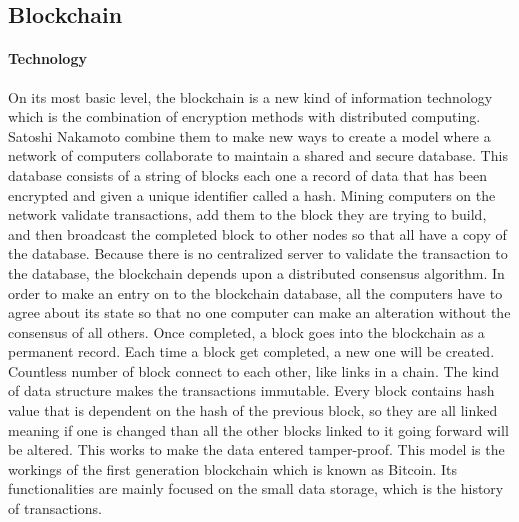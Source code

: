 \documentclass [12pt]{article}
\begin{document}
\subsection{Blockchain}
\paragraph{Technology}
On its most basic level, 
the blockchain is a new kind of information technology 
which is the combination of encryption methods with distributed computing.
Satoshi Nakamoto \cite{nakamoto2008bitcoin} combine them to make new ways to create a model 
where a network of computers collaborate to maintain a shared and secure database. 
This database consists of a string of blocks each one a record of data 
that has been encrypted and given a unique identifier called a hash.
Mining computers on the network validate transactions, 
add them to the block they are trying to build, 
and then broadcast the completed block to other nodes 
so that all have a copy of the database. 
Because there is no centralized server to validate the transaction to the database,
the blockchain depends upon a distributed consensus algorithm. 
In order to make an entry on to the blockchain database, 
all the computers have to agree about its state 
so that no one computer can make an alteration without the consensus of all others.
Once completed, a block goes into the blockchain as a permanent record. Each time a block get completed, a new one will be created.
Countless number of block connect to each other, like links in a chain. The kind of data structure makes the transactions immutable.
Every block contains hash value that is dependent on the hash of the previous block, 
so they are all linked meaning if one is changed than all the other blocks linked to it going forward will be altered.
This works to make the data entered tamper-proof. 
This model is the workings of the first generation blockchain which is known as Bitcoin.
Its functionalities are mainly focused on the small data storage, which is the history of transactions.
\end{document}
